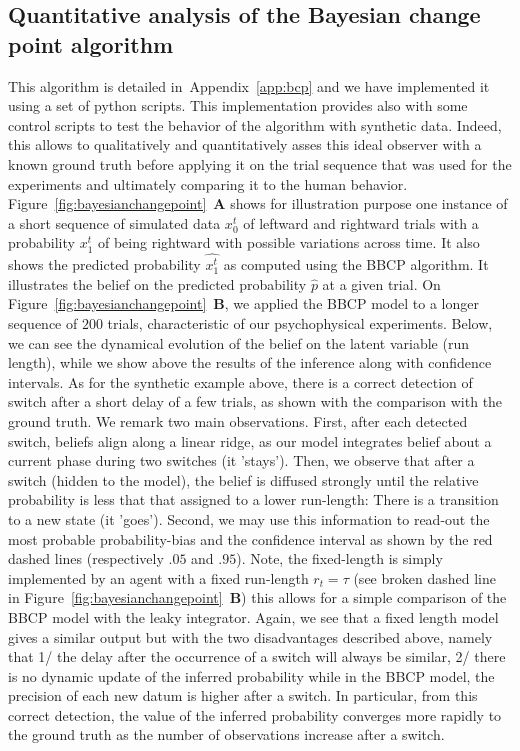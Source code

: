 \documentclass[12pt,english]{article}%
\newcommand{\seeFig}[1]{Figure~\ref{fig:#1}}
\newcommand{\seeApp}[1]{Appendix~\ref{app:#1}}
\begin{document}
\subsection{Quantitative analysis of the Bayesian change point algorithm}
This algorithm is detailed in~\seeApp{bcp} and 
we have implemented it using a set of python scripts.
This implementation provides also with some control scripts
to test the behavior of the algorithm with synthetic data.
Indeed, this allows to qualitatively and quantitatively asses
this ideal observer with a known ground truth before applying it
on the trial sequence that was used for the experiments and 
ultimately comparing it to the human behavior. %
\seeFig{bayesianchangepoint}~\textbf{A} shows for illustration purpose
one instance of a short sequence of simulated data $x_0^t$
of leftward and rightward trials with a probability $x_1^t$
of being rightward with possible variations across time.
It also shows the predicted probability $\hat{x_1^t}$
as computed using the BBCP algorithm.
It illustrates
the belief on the predicted probability $\hat{p}$ at a given trial.
On \seeFig{bayesianchangepoint}~\textbf{B},
we applied the BBCP model to 
a longer sequence of $200$ trials,
characteristic of our psychophysical experiments.
Below, 
we can see the dynamical evolution of the belief on the latent variable (run length),
while we show above the results of the inference along with confidence intervals.
As for the synthetic example above,
there is a correct detection of switch after a short delay of a few trials,
as shown with the comparison with the ground truth.
We remark two main observations.
First, after each detected switch, beliefs align along a linear ridge,
as our model integrates belief about a current phase during two switches (it 'stays').
Then, we observe that after a switch (hidden to the model),
the belief is diffused strongly until the relative probability
is less that that assigned to a lower run-length:
There is a transition to a new state (it 'goes').
Second, we may use this information to read-out the most probable probability-bias and the confidence interval
as shown by the red dashed lines (respectively $.05$ and $.95$).
Note, the fixed-length is simply implemented
by an agent with a fixed run-length $r_t=\tau$ (see broken dashed line in \seeFig{bayesianchangepoint}~\textbf{B})
this allows for a simple comparison of the BBCP model with the leaky integrator.
Again, we see that a fixed length model gives a similar output
but with the two disadvantages described above, namely that
1/ the delay after the occurrence of a switch will always be similar,
2/ there is no dynamic update of the inferred probability 
while in the BBCP model, the precision of each new datum 
is higher after a switch.
In particular, from this correct detection,
the value of the inferred probability converges more rapidly to the ground truth
as the number of observations increase after a switch.
\end{document}
